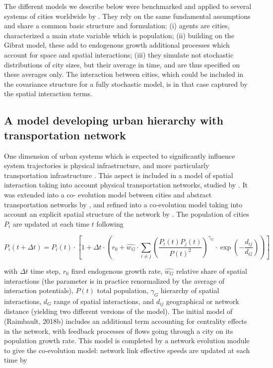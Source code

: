 \documentclass[10pt]{article}
\begin{document}
The different models we describe below were benchmarked and applied to several systems of cities worldwide by \citep{raimbault2020empowering}. They rely on the same fundamental assumptions and share a common basic structure and formulation: (i) agents are cities, characterized a main state variable which is population; (ii) building on the Gibrat model, these add to endogenous growth additional processes which account for space and spatial interactions; (iii) they simulate not stochastic distributions of city sizes, but their average in time, and are thus specified on these averages only. The interaction between cities, which could be included in the covariance structure for a fully stochastic model, is in that case captured by the spatial interaction terms.


\subsection{A model developing urban hierarchy with transportation network}


One dimension of urban systems which is expected to significantly influence system trajectories is physical infrastructure, and more particularly transportation infrastructure \citep{dupuy1987vers}. This aspect is included in a model of spatial interaction taking into account physical transportation networks, studied by \citep{raimbault2020indirect}. It was extended into a co- evolution model between cities and abstract transportation networks by \citep{raimbault2020modeling}, and refined into a co-evolution model taking into account an explicit spatial structure of the network by \citep{raimbault2020hierarchy}. The population of cities $P_i$ are updated at each time $t$ following

\begin{equation}
	P_i (t + \Delta t) = P_i(t) \cdot \left[ 1 + \Delta t \cdot \left( r_0 + \hat{w_G} \cdot \sum_{i \neq j} \left( \frac{P_i(t)P_j(t)}{P(t)^2}\right)^{\gamma_G}  \cdot \exp \left( - \frac{d_{ij}}{d_G} \right)\right) \right]	
\end{equation}

with $\Delta t$ time step, $r_0$ fixed endogenous growth rate, $\hat{w_G}$ relative share of spatial interactions (the parameter is in practice renormalized by the average of interaction potentials), $P(t)$ total population, $\gamma_G$ hierarchy of spatial interactions, $d_G$ range of spatial interactions, and $d_{ij}$ geographical or network distance (yielding two different versions of the model). The initial model of (Raimbault, 2018b) includes an additional term accounting for centrality effects in the network, with feedback processes of flows going through a city on its population growth rate. This model is completed by a network evolution module to give the co-evolution model: network link effective speeds are updated at each time by
\end{document}

